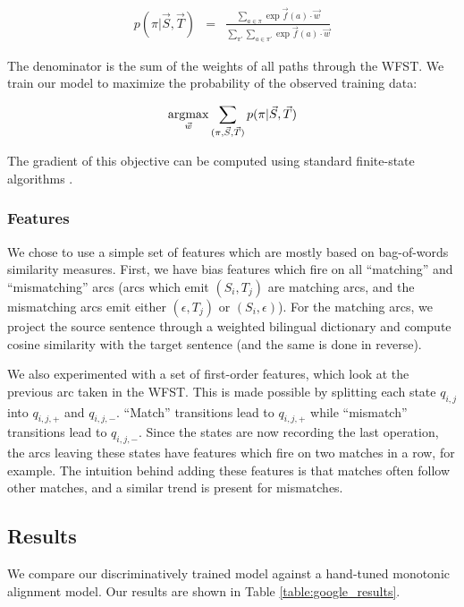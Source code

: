 \begin{align*}
p(\pi|\vec{S}, \vec{T}) &=& \frac{\sum_{a \in \pi}
\exp \vec{f}(a)\cdot\vec{w}}{\sum_{\pi'}\sum_{a \in \pi'}\exp \vec{f}(a)\cdot\vec{w}}
\end{align*}

The denominator is the sum of the weights of all paths through the WFST.
We train our model to maximize the probability of the observed training data:

\begin{align*}
\underset{\vec{w}}{\operatorname{argmax}} \sum_{(\pi,\vec{S},\vec{T})} p(\pi|\vec{S},\vec{T})
\end{align*}

The gradient of this objective can be computed using standard finite-state
algorithms \citep{Eisner02}.

\subsubsection{Features}
\label{sec:mono_feats}
We chose to use a simple set of features which are mostly based on
bag-of-words similarity measures. First, we have bias features which fire on all
``matching'' and ``mismatching'' arcs (arcs which emit $(S_i, T_j)$ are matching
arcs, and the mismatching arcs emit either $(\epsilon, T_j)$ or $(S_i,
\epsilon)$). For the matching arcs, we project the source sentence through a
weighted bilingual dictionary and compute cosine similarity with the target
sentence (and the same is done in reverse).

We also experimented with a set of first-order features, which look at the
previous arc taken in the WFST. This is made possible by splitting each state
$q_{i,j}$ into $q_{i,j,+}$ and $q_{i,j,-}$. ``Match'' transitions lead to
$q_{i,j,+}$ while ``mismatch'' transitions lead to $q_{i,j,-}$. Since the states
are now recording the last operation, the arcs leaving these states have
features which fire on two matches in a row, for example. The intuition behind
adding these features is that matches often follow other matches, and a similar
trend is present for mismatches.

\subsection{Results}

We compare our discriminatively trained model against a hand-tuned monotonic
alignment model. Our results are shown in Table \ref{table:google_results}.

